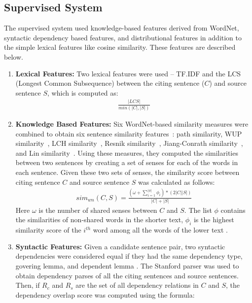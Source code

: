 \documentclass[11pt]{article}
\begin{document}
\subsection{Supervised System}
The supervised system used knowledge-based features derived from WordNet, syntactic dependency based features, and distributional features in addition to the simple lexical features like cosine similarity. These features are described below.


\begin{enumerate}
\item{\bf Lexical Features:} Two lexical features were used -- TF.IDF and the LCS (Longest Common Subsequence) between the citing sentence ($C$) and source sentence $S$, which is computed as:
\vspace{-.3cm}
\begin{eqnarray*}
  \frac{|LCS|}{min(|C|,|S|)}
\end{eqnarray*}
\item{\bf Knowledge Based Features:} Six WordNet-based similarity measures were combined to obtain six sentence similarity features~\cite{Banea2012}: path similarity, WUP similarity~\cite{Wu:1994:VSL:981732.981751}, LCH similarity~\cite{leacock1998combining}, Resnik similarity~\cite{Resnik:1995:UIC:1625855.1625914}, Jiang-Conrath similarity~\cite{Jiang97taxonomySimilarity}, and Lin similarity~\cite{Lin:1998:IDS:645527.657297}. 
Using these measures, they computed the similarities between two sentences by creating a set of senses for each of the words in each sentence. Given these two sets of senses, the similarity score between citing sentence $C$ and source sentence $S$ was calculated as follows:
\vspace{-.3cm}
\begin{eqnarray*}
  sim_{wn}(C,S) = \frac{(\omega + \sum_{i=1}^{|\phi|}\phi_i) * (2|C||S|)}{|C|+|S|}
\end{eqnarray*}
Here $\omega$ is the number of shared senses between $C$ and $S$. The list $\phi$ contains the similarities of non-shared words in the shorter text, $\phi_i$ is the highest similarity score of the $i^{th}$ word among all the words of the lower text \cite{S13-1017}. 
\item{\bf Syntactic Features:} Given a candidate sentence pair, two syntactic dependencies were considered equal if they had the same dependency type, govering lemma, and dependent lemma \cite{S13-1017}. The Stanford parser was used to obtain dependency parses of all the citing sentences and source sentences. Then, if $R_c$ and $R_s$ are the set of all dependency relations in $C$ and $S$, the dependency overlap score was computed using the formula:


\end{enumerate}
\end{document}
